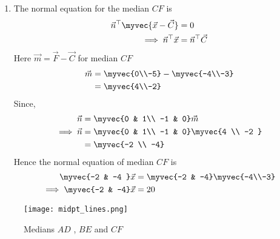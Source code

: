 \documentclass[11pt]{book}
\begin{document}
\begin{enumerate}[label=\thesection.\arabic*.,ref=\thesection.\theenumi]
\begin{enumerate}
\item The normal equation for the median $CF$ is
\begin{align}
\vec{n}^{\top}\myvec{\vec{x}-\vec{C}}&=0\\
\implies
\vec{n}^{\top}\vec{x}&=\vec{n}^{\top}\vec{C}
\end{align}
Here $\vec{m} = \vec{F}- \vec{C}$ for median $CF$
\begin{align}
\vec{m}&=\myvec{0\\-5} - \myvec{-4\\-3}\\
       &=\myvec{4\\-2}
\end{align}
Since,
\begin{align}
  \vec{n} &= \myvec{0 & 1\\
  -1 & 0}\vec{m}\\
\implies
\vec{n} &= \myvec{0 & 1\\
  -1 & 0}\myvec{4 \\ -2 }\\
        &= \myvec{-2 \\ -4}
\end{align}
Hence the normal equation of median $CF$ is 
\begin{align}
    \myvec{-2 & -4 }\vec{x}&=\myvec{-2 & -4}\myvec{-4\\-3}\\
\implies
    \myvec{-2 & -4}\vec{x}&=20
\end{align}
\end{enumerate}
\begin{figure}
\texttt{[image: midpt\_lines.png]}
\caption{ Medians $AD$ , $BE$ and $CF$}
\label{fig: medians}
\end{figure}



\end{enumerate}
\end{document}
